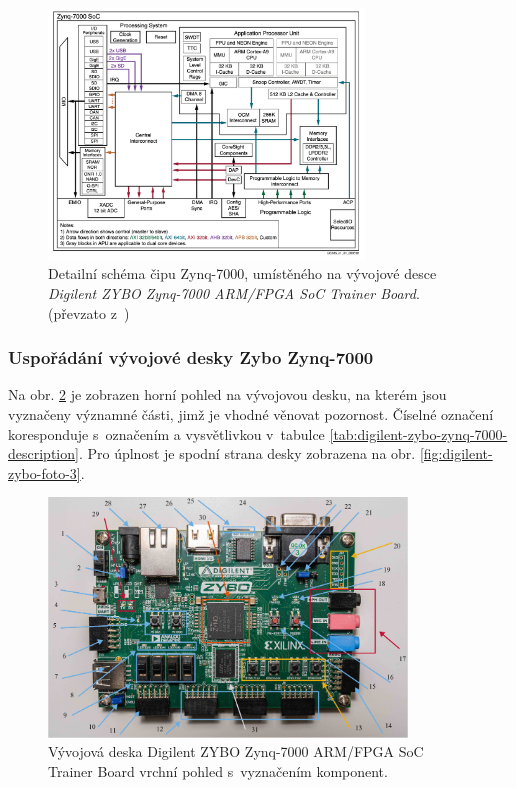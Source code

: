 \documentclass[a4paper, twoside, 11pt]{article}
\newcommand{\fbar}{\FloatBarrier}
\begin{document}
			\begin{figure}[htbp!]
				\centering
					\includegraphics[width=0.75\textwidth]{src/png/zynq-block-diagram-detailed.png} 
					\caption{Detailní schéma čipu Zynq-7000, umístěného na vývojové desce \textit{Digilent ZYBO Zynq-7000 ARM/FPGA SoC Trainer Board}. (převzato z~\cite{xilinx-zynq-7000-technical-reference-manual})}
					\label{fig:zynq-block-diagram-detailed}
			\end{figure}
			\fbar
			\subsubsection{Uspořádání vývojové desky Zybo Zynq-7000}
				Na obr. \ref{fig:digilent-zybo-foto-1-oznacene} je zobrazen horní pohled na vývojovou desku, na kterém jsou vyznačeny významné části, jimž je vhodné věnovat pozornost. Číselné označení koresponduje s~označením a vysvětlivkou v~tabulce \ref{tab:digilent-zybo-zynq-7000-description}. Pro úplnost je spodní strana desky zobrazena na obr. \ref{fig:digilent-zybo-foto-3}.

				\begin{figure}[H]
					\centering
						\includegraphics[width=0.85\textwidth]{src/jpg/digilent-zybo-foto-1-oznacene.jpeg} 
						\caption{Vývojová deska Digilent ZYBO Zynq-7000 ARM/FPGA SoC Trainer Board vrchní pohled s~vyznačením komponent.}
						\label{fig:digilent-zybo-foto-1-oznacene}
				\end{figure}
\end{document}
